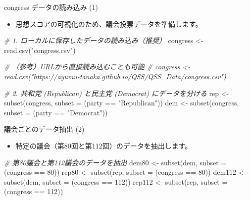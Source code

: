 \documentclass[
  ignorenonframetext,
]{beamer}
\newenvironment{Shaded}{\begin{snugshade}}{\end{snugshade}}
\newcommand{\AttributeTok}[1]{\textcolor[rgb]{0.77,0.63,0.00}{#1}}
\newcommand{\CommentTok}[1]{\textcolor[rgb]{0.56,0.35,0.01}{\textit{#1}}}
\newcommand{\DecValTok}[1]{\textcolor[rgb]{0.00,0.00,0.81}{#1}}
\newcommand{\FunctionTok}[1]{\textcolor[rgb]{0.00,0.00,0.00}{#1}}
\newcommand{\NormalTok}[1]{#1}
\newcommand{\OtherTok}[1]{\textcolor[rgb]{0.56,0.35,0.01}{#1}}
\newcommand{\SpecialCharTok}[1]{\textcolor[rgb]{0.00,0.00,0.00}{#1}}
\newcommand{\StringTok}[1]{\textcolor[rgb]{0.31,0.60,0.02}{#1}}
\providecommand{\tightlist}{%
  \setlength{\itemsep}{0pt}\setlength{\parskip}{0pt}}
\begin{document}
\begin{frame}[fragile]{congress データの読み込み (1)}
\protect\hypertarget{congress-ux30c7ux30fcux30bfux306eux8aadux307fux8fbcux307f-1}{}
\begin{itemize}
\tightlist
\item
  思想スコアの可視化のため、議会投票データを準備します。
\end{itemize}

\scriptsize

\begin{Shaded}
\begin{Highlighting}[]
\CommentTok{\# 1. ローカルに保存したデータの読み込み（推奨）}
\NormalTok{congress }\OtherTok{\textless{}{-}} \FunctionTok{read.csv}\NormalTok{(}\StringTok{"congress.csv"}\NormalTok{)}

\CommentTok{\# （参考）URLから直接読み込むことも可能}
\CommentTok{\# congress \textless{}{-} read.csv("https://ayumu{-}tanaka.github.io/QSS/QSS\_Data/congress.csv")}

\CommentTok{\# 2. 共和党 (Republican) と民主党 (Democrat) にデータを分ける}
\NormalTok{rep }\OtherTok{\textless{}{-}} \FunctionTok{subset}\NormalTok{(congress, }\AttributeTok{subset =}\NormalTok{ (party }\SpecialCharTok{==} \StringTok{"Republican"}\NormalTok{))}
\NormalTok{dem }\OtherTok{\textless{}{-}} \FunctionTok{subset}\NormalTok{(congress, }\AttributeTok{subset =}\NormalTok{ (party }\SpecialCharTok{==} \StringTok{"Democrat"}\NormalTok{))}
\end{Highlighting}
\end{Shaded}

\normalsize
\end{frame}

\begin{frame}[fragile]{議会ごとのデータ抽出 (2)}
\protect\hypertarget{ux8b70ux4f1aux3054ux3068ux306eux30c7ux30fcux30bfux62bdux51fa-2}{}
\begin{itemize}
\tightlist
\item
  特定の議会（第80回と第112回）のデータを抽出します。
\end{itemize}

\scriptsize

\begin{Shaded}
\begin{Highlighting}[]
\CommentTok{\# 第80議会と第112議会のデータを抽出}
\NormalTok{dem80 }\OtherTok{\textless{}{-}} \FunctionTok{subset}\NormalTok{(dem, }\AttributeTok{subset =}\NormalTok{ (congress }\SpecialCharTok{==} \DecValTok{80}\NormalTok{))}
\NormalTok{rep80 }\OtherTok{\textless{}{-}} \FunctionTok{subset}\NormalTok{(rep, }\AttributeTok{subset =}\NormalTok{ (congress }\SpecialCharTok{==} \DecValTok{80}\NormalTok{))}
\NormalTok{dem112 }\OtherTok{\textless{}{-}} \FunctionTok{subset}\NormalTok{(dem, }\AttributeTok{subset =}\NormalTok{ (congress }\SpecialCharTok{==} \DecValTok{112}\NormalTok{))}
\NormalTok{rep112 }\OtherTok{\textless{}{-}} \FunctionTok{subset}\NormalTok{(rep, }\AttributeTok{subset =}\NormalTok{ (congress }\SpecialCharTok{==} \DecValTok{112}\NormalTok{))}
\end{Highlighting}
\end{Shaded}

\normalsize
\end{frame}
\end{document}
